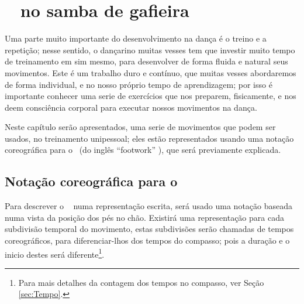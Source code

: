 

\chapter{ \Footwork~ no samba de gafieira }

Uma parte muito importante do desenvolvimento na dança é o treino e a repetição;
nesse sentido, o dançarino muitas vesses tem que investir muito tempo 
de treinamento em sim mesmo, para desenvolver de forma fluida e natural seus movimentos.
Este é um trabalho duro e contínuo, que muitas vesses abordaremos de forma individual, 
e no nosso próprio tempo de aprendizagem; 
por isso é importante conhecer uma serie de exercícios que nos preparem,
fisicamente, e nos deem consciência corporal para executar nossos movimentos na dança.

Neste capítulo serão apresentados, uma serie de movimentos que podem ser usados,
no treinamento unipessoal; eles estão representados usando uma notação coreográfica
para o \footwork~(do inglês ``footwork'' ), que será previamente explicada.
 
\section{Notação coreográfica para o \footwork }
Para descrever o \footwork~ numa representação escrita, 
será usado uma notação baseada numa vista da posição dos pés no chão. 
Existirá uma representação para cada subdivisão temporal do movimento, 
estas subdivisões serão chamadas de tempos coreográficos, 
para diferenciar-lhos dos tempos do compasso; 
pois a duração e o inicio destes será diferente\footnote{Para 
mais detalhes da contagem dos tempos no compasso, ver Seção \ref{sec:Tempo}.}.

